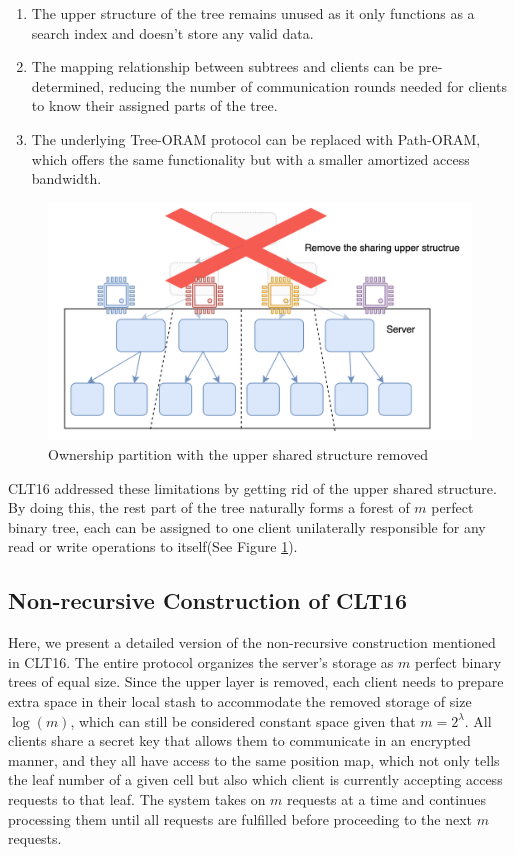 \documentclass[fontsize=11pt]{article}
\begin{document}
\begin{enumerate}
    \item The upper structure of the tree remains unused as it only functions as a search index and doesn't store any valid data.
    \item The mapping relationship between subtrees and clients can be pre-determined, reducing the number of communication rounds needed for clients to know their assigned parts of the tree.
    \item The underlying Tree-ORAM protocol can be replaced with Path-ORAM, which offers the same functionality but with a smaller amortized access bandwidth.  
\end{enumerate}

\begin{figure}
    \centering
    \includegraphics[width=1\linewidth]{pics/ownership_partition.png}
    \caption{Ownership partition with the upper shared structure removed}
    \label{fig:ownership_partition}
\end{figure}

CLT16 addressed these limitations by getting rid of the upper shared structure. By doing this, the rest part of the tree naturally forms a forest of $m$ perfect binary tree, each can be assigned to one client unilaterally responsible for any read or write operations to itself(See Figure \ref{fig:ownership_partition}).

\subsection{Non-recursive Construction of CLT16}

Here, we present a detailed version of the non-recursive construction mentioned in CLT16. The entire protocol organizes the server's storage as $m$ perfect binary trees of equal size. Since the upper layer is removed, each client needs to prepare extra space in their local stash to accommodate the removed storage of size $\log(m)$, which can still be considered constant space given that $m = 2^\lambda$. All clients share a secret key that allows them to communicate in an encrypted manner, and they all have access to the same position map, which not only tells the leaf number of a given cell but also which client is currently accepting access requests to that leaf. The system takes on $m$ requests at a time and continues processing them until all requests are fulfilled before proceeding to the next $m$ requests.
\end{document}

